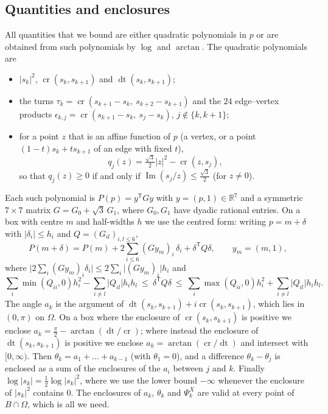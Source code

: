 \documentclass[11pt]{amsart}
\theoremstyle{definition}
\theoremstyle{remark}
\newcommand{\R}{\mathbb{R}}
\newcommand{\cross}{\operatorname{cr}}
\newcommand{\dotp}{\operatorname{dt}}
\renewcommand{\Im}{\operatorname{Im}}
\newcommand{\sq}{\tfrac{\sqrt3}{2}}
\begin{document}
\subsection{Quantities and enclosures}
All quantities that we bound are either quadratic polynomials in $p$ or are obtained from such polynomials by $\log$ and $\arctan$. The quadratic polynomials are
\begin{itemize}[leftmargin=2em]
\item $\lvert s_k\rvert^2$, $\cross(s_k,s_{k+1})$ and $\dotp(s_k,s_{k+1})$;
\item the turns $\tau_k=\cross(s_{k+1}-s_k,\ s_{k+2}-s_{k+1})$ and the $24$ edge--vertex products $\epsilon_{k,j}=\cross(s_{k+1}-s_k,\ s_j-s_k)$, $j\notin\{k,k+1\}$;
\item for a point $z$ that is an affine function of $p$ (a vertex, or a point $(1-t)s_k+ts_{k+1}$ of an edge with fixed $t$),
\[
q_j(z)=\tfrac{\sqrt3}{2}\lvert z\rvert^2-\cross(z,s_j),
\]
so that $q_j(z)\ge0$ if and only if $\Im(s_j/z)\le\sq$ (for $z\neq0$).
\end{itemize}
Each such polynomial is $P(p)=y^{\mathsf T}Gy$ with $y=(p,1)\in\R^7$ and a symmetric $7\times7$ matrix $G=G_0+\sqrt3\,G_1$, where $G_0,G_1$ have dyadic rational entries. On a box with centre $m$ and half-widths $h$ we use the centred form: writing $p=m+\delta$ with $\lvert\delta_i\rvert\le h_i$ and $Q=(G_{il})_{i,l\le6}$,
\[
P(m+\delta)=P(m)+2\sum_{i\le6}(Gy_m)_i\,\delta_i+\delta^{\mathsf T}Q\delta,\qquad y_m=(m,1),
\]
where $\lvert2\sum_i(Gy_m)_i\delta_i\rvert\le2\sum_i\lvert(Gy_m)_i\rvert h_i$ and
\[
\sum_i\min(Q_{ii},0)h_i^2-\sum_{i\neq l}\lvert Q_{il}\rvert h_ih_l\ \le\ \delta^{\mathsf T}Q\delta\ \le\ \sum_i\max(Q_{ii},0)h_i^2+\sum_{i\neq l}\lvert Q_{il}\rvert h_ih_l .
\]
The angle $a_k$ is the argument of $\dotp(s_k,s_{k+1})+i\cross(s_k,s_{k+1})$, which lies in $(0,\pi)$ on $\Omega$. On a box where the enclosure of $\cross(s_k,s_{k+1})$ is positive we enclose $a_k=\frac\pi2-\arctan(\dotp/\cross)$; where instead the enclosure of $\dotp(s_k,s_{k+1})$ is positive we enclose $a_k=\arctan(\cross/\dotp)$ and intersect with $[0,\infty)$. Then $\theta_k=a_1+\dots+a_{k-1}$ (with $\theta_1=0$), and a difference $\theta_k-\theta_j$ is enclosed as a sum of the enclosures of the $a_i$ between $j$ and $k$. Finally $\log\lvert s_k\rvert=\frac12\log\lvert s_k\rvert^2$, where we use the lower bound $-\infty$ whenever the enclosure of $\lvert s_k\rvert^2$ contains $0$. The enclosures of $a_k$, $\theta_k$ and $\Psi^X_k$ are valid at every point of $B\cap\Omega$, which is all we need.
\end{document}

